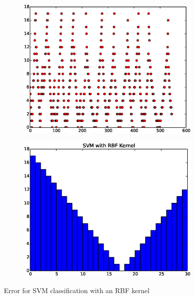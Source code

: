 \documentclass{article}
\begin{document}
\begin{figure}[H]
  \begin{subfigure}[!h]{0.5\textwidth}
    \centering
    \includegraphics[width=\textwidth]{./woodley/SVM_with_RBF_Kernel_heading_plot.eps}
  \end{subfigure}
  \begin{subfigure}[!h]{0.5\textwidth}
    \centering
    \includegraphics[width=\textwidth]{./woodley/SVM_with_RBF_Kernel_heading_bar.eps}
  \end{subfigure}
  \caption{Error for SVM classification with an RBF kernel}
\end{figure}
\end{document}
